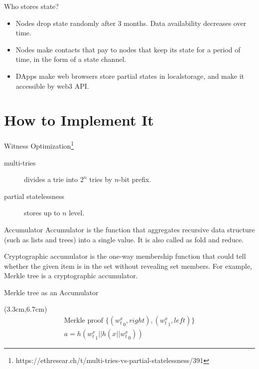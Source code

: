 \documentclass{beamer}
\begin{document}
\begin{frame}{Who stores state?}
  \begin{itemize}
    \item Nodes drop state randomly after 3 months. Data availability decreases over time.
    \item Nodes make contacts that pay to nodes that keep its state for a period of time, in the form of a state channel.
    \item DApps make web browsers store partial states in localstorage, and make it accessible by web3 API.
  \end{itemize}
\end{frame}

\section{How to Implement It}

\begin{frame}{Witness Optimization\footnote{https://ethresear.ch/t/multi-tries-vs-partial-statelessness/391}}
  \begin{description}
    \item[multi-tries] divides a trie into $2^n$ tries by $n$-bit prefix.
    \item[partial statelessness] stores up to $n$ level.
  \end{description}
\end{frame}

\begin{frame}{Accumulator}
Accumulator is the function that aggregates recursive data structure (such as lists and trees) into a single value. It is also called as fold and reduce.

Cryptographic accumulator is the one-way membership function that could tell whether the given item is in the set without revealing set members. For example, Merkle tree is a cryptographic accumulator.
\end{frame}

\begin{frame}{Merkle tree as an Accumulator}
\begin{center}

\end{center}

\begin{textblock*}{5cm}(3.3cm,6.7cm)
\begin{gather*}
\textrm{Merkle proof } \{ ({w^x_t}_0, right), ({w^x_t}_1, left) \} \\
a = h({w^x_t}_1 || h(x || {w^x_t}_0))
\end{gather*}
\end{textblock*}
\end{frame}
\end{document}
